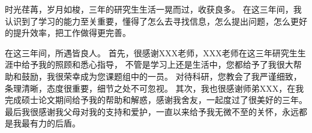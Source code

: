 \begin{acknowledgements}
时光荏苒，岁月如梭，三年的研究生生活一晃而过，收获良多。
在这三年间，我认识到了学习的能力至关重要，懂得了怎么去寻找信息，怎么提出问题，怎么更好的提升效率，把工作做得更完善。

在这三年间，所遇皆良人。
首先，很感谢XXX老师，XXX老师在这三年研究生生涯中给予我的照顾和悉心指导，
不管是学习上还是生活中，您都给予了我很大帮助和鼓励，我很荣幸成为您课题组中的一员。
对待科研，您教会了我严谨细致，条理清晰，态度很重要，细节之处不可忽视。
其次，我也很感谢师弟XXX，在我完成硕士论文期间给予我的帮助和解惑，感谢我舍友，一起度过了很美好的三年。
最后我很感谢我父母对我的支持和爱护，一直以来给予我无微不至的关怀，永远都是我最有力的后盾。
\end{acknowledgements}
